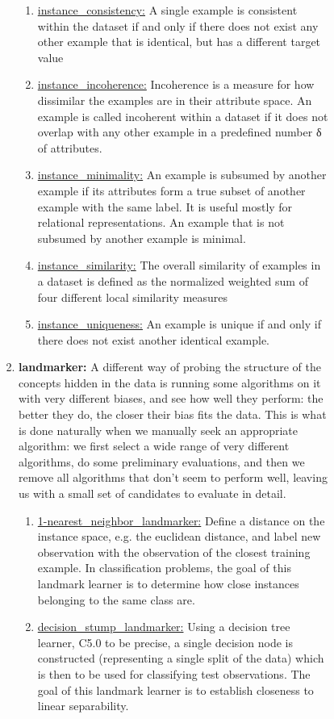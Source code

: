 \documentclass[a4paper,12pt, english]{article}
\begin{document}
\begin{enumerate}
\begin{enumerate}
\begin{enumerate}
\begin{enumerate}
\begin{enumerate}
				\begin{enumerate}
				\item \underline{instance\_consistency:} A single example is consistent within the dataset if and only if there does not exist any other example that is identical, but has a different target value
				\item \underline{instance\_incoherence:} Incoherence is a measure for how dissimilar the examples are in their attribute space. An example is called incoherent within a dataset if it does not overlap with any other example in a predefined number δ of attributes.
				\item \underline{instance\_minimality:} An example is subsumed by another example if its attributes form a true subset of another example with the same label. It is useful mostly for relational representations. An example that is not subsumed by another example is minimal. 
				\item \underline{instance\_similarity:}  The overall similarity of examples in a dataset is defined as the normalized weighted sum of four different local similarity measures
				\item \underline{instance\_uniqueness:} An example is unique if and only if there does not exist another identical example.
				\end{enumerate}			
			\item \textbf{landmarker:} A different way of probing the structure of the concepts hidden in the data is running some algorithms on it with very different biases, and see how well they perform: the better they do, the closer their bias fits the data. This is what is done naturally when we manually seek an appropriate algorithm: we first select a wide range of very different algorithms, do some preliminary evaluations, and then we remove all algorithms that don’t seem to perform well, leaving us with a small set of candidates to evaluate in detail.
				\begin{enumerate}
				\item \underline{1-nearest\_neighbor\_landmarker:}  Define a distance on the instance space, e.g. the euclidean distance, and label new observation with the observation of the closest training example. In classification problems, the goal of this landmark learner is to determine how close instances belonging to the same class are.
				\item \underline{decision\_stump\_landmarker:} Using a decision tree learner, C5.0 to be precise, a single decision node is constructed (representing a single split of the data) which is then to be used for classifying test observations. The goal of this landmark learner is to establish closeness to linear separability.

\end{enumerate}
\end{enumerate}
\end{enumerate}
\end{enumerate}
\end{enumerate}
\end{enumerate}
\end{document}

